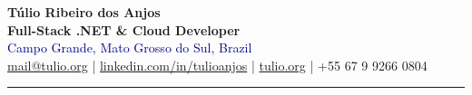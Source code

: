 \documentclass[a4paper,10pt]{article}
\begin{document}

\begin{center}
    {\Huge \textbf{Túlio Ribeiro dos Anjos}} \\[1mm]
    {\large \textbf{Full-Stack .NET \& Cloud Developer}} \\[2mm]
    \textcolor{darkblue}{Campo Grande, Mato Grosso do Sul, Brazil} \\[1mm]
    \href{mailto:mail@tulio.org}{mail@tulio.org} \quad | \quad 
    \href{https://www.linkedin.com/in/tulioanjos}{linkedin.com/in/tulioanjos} \quad | \quad
    \href{https://tulio.org}{tulio.org} \quad | \quad +55 67 9 9266 0804
\end{center}
\vspace{2mm}
\hrule
\vspace{4mm}
\end{document}

